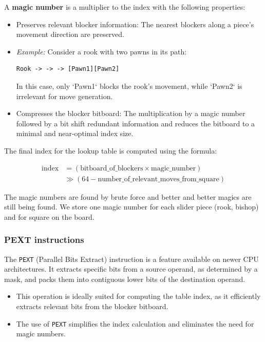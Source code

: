 \vspace{1em}

A \textbf{magic number} is a multiplier to the index with the following properties:

\begin{itemize}
  \item Preserves relevant blocker information: 
  The nearest blockers along a piece’s movement direction are preserved. 
  \item \textit{Example:} Consider a rook with two pawns in its path:
  \begin{lstlisting}[breaklines=true]
    Rook -> -> -> [Pawn1][Pawn2]
  \end{lstlisting}
  In this case, only `Pawn1` blocks the rook's movement, while `Pawn2` is irrelevant for move generation.
  \item Compresses the blocker bitboard: The multiplication by a magic number followed by a bit shift redundant information and reduces the bitboard to a minimal and near-optimal index size.
\end{itemize}

\noindent The final index for the lookup table is computed using the formula:

\begin{align*}
  \text{index} &= (\text{bitboard\_of\_blockers} \times \text{magic\_number}) \\
  &\gg (64 - \text{number\_of\_relevant\_moves\_from\_square})
\end{align*}

\noindent The magic numbers are found by brute force and better and better magics are still being found. We store one magic number for each slider piece (rook, bishop) and for square on the board.

\subsubsection{PEXT instructions}

The \texttt{PEXT} (Parallel Bits Extract) instruction is a feature available on newer CPU architectures. It extracts specific bits from a source operand, as determined by a mask, and packs them into contiguous lower bits of the destination operand.

\begin{itemize}
  \item This operation is ideally suited for computing the table index, as it efficiently extracts relevant bits from the blocker bitboard.
  \item The use of \texttt{PEXT} simplifies the index calculation and eliminates the need for magic numbers.
\end{itemize}


